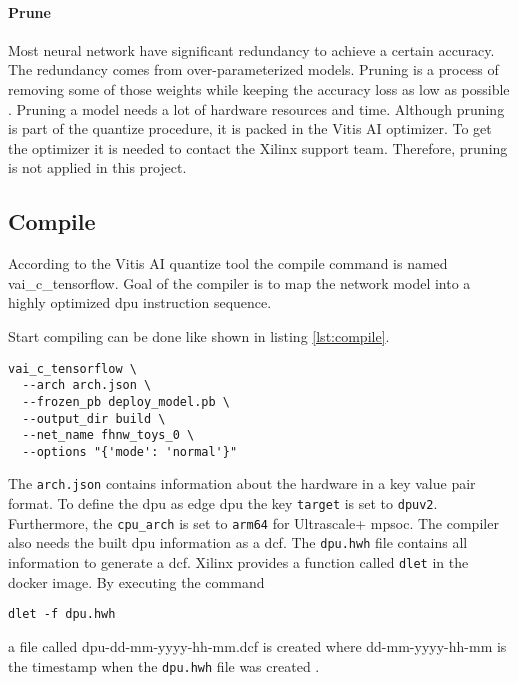 \paragraph{Prune}
Most neural network have significant redundancy to achieve a certain accuracy.
The redundancy comes from over-parameterized models.
Pruning is a process of removing some of those weights while keeping the accuracy loss as low as possible \cite{pruning_overview}.
Pruning a model needs a lot of hardware resources and time.
Although pruning is part of the quantize procedure, it is packed in the Vitis AI optimizer.
To get the optimizer it is needed to contact the Xilinx support team.
Therefore, pruning is not applied in this project.

\subsection{Compile}
\label{subsec:embedded_platform:model_deployment:compile}
According to the Vitis AI quantize tool the compile command is named vai\_c\_tensorflow.
Goal of the compiler is to map the network model into a highly optimized \acrshort{dpu} instruction sequence.

Start compiling can be done like shown in listing \ref{lst:compile}.

\begin{lstlisting}[style=bash, caption={Compile command}, label=lst:compile]
  vai_c_tensorflow \
  --arch arch.json \
  --frozen_pb deploy_model.pb \
  --output_dir build \
  --net_name fhnw_toys_0 \
  --options "{'mode': 'normal'}"
\end{lstlisting}

The \texttt{arch.json} contains information about the hardware in a key value pair format.
To define the \acrshort{dpu} as edge \acrshort{dpu} the key \texttt{target} is set to \texttt{dpuv2}.
Furthermore, the \texttt{cpu\_arch} is set to \texttt{arm64} for Ultrascale+ \acrshort{mpsoc}.
The compiler also needs the built \acrshort{dpu} information as a \acrfull{dcf}.
The \texttt{dpu.hwh} file contains all information to generate a \acrshort{dcf}.
Xilinx provides a function called \texttt{dlet} in the docker image.
By executing the command
\begin{lstlisting}[style=bash, caption={}, label=lst:dlet]
  dlet -f dpu.hwh
\end{lstlisting}
a file called dpu-dd-mm-yyyy-hh-mm.dcf is created where dd-mm-yyyy-hh-mm is the timestamp when the \texttt{dpu.hwh} file was created \cite{vitis_ai_user_guide}.


